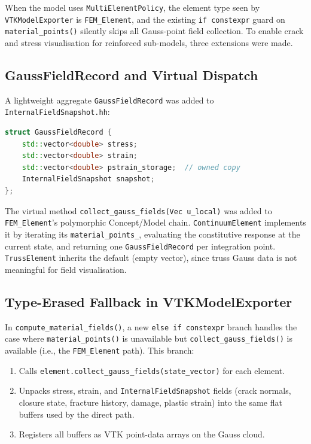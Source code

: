 When the model uses \texttt{MultiElementPolicy}, the element type seen
by \texttt{VTKModelExporter} is \texttt{FEM\_Element}, and the existing
\texttt{if constexpr} guard on \texttt{material\_points()} silently
skips all Gauss-point field collection.  To enable crack and stress
visualisation for reinforced sub-models, three extensions were made.

\subsection{GaussFieldRecord and Virtual Dispatch}

A lightweight aggregate \texttt{GaussFieldRecord} was added to
\texttt{InternalFieldSnapshot.hh}:

\begin{lstlisting}[language=C++, basicstyle=\ttfamily\small]
struct GaussFieldRecord {
    std::vector<double> stress;
    std::vector<double> strain;
    std::vector<double> pstrain_storage;  // owned copy
    InternalFieldSnapshot snapshot;
};
\end{lstlisting}

The virtual method \texttt{collect\_gauss\_fields(Vec\,u\_local)} was added
to \texttt{FEM\_Element}'s polymorphic Concept/Model chain.
\texttt{ContinuumElement} implements it by iterating its
\texttt{material\_points\_}, evaluating the constitutive response at the
current state, and returning one \texttt{GaussFieldRecord} per integration
point.  \texttt{TrussElement} inherits the default (empty vector), since
truss Gauss data is not meaningful for field visualisation.

\subsection{Type-Erased Fallback in VTKModelExporter}

In \texttt{compute\_material\_fields()}, a new \texttt{else if constexpr}
branch handles the case where \texttt{material\_points()} is unavailable
but \texttt{collect\_gauss\_fields()} is available (i.e., the
\texttt{FEM\_Element} path).  This branch:

\begin{enumerate}
  \item Calls \texttt{element.collect\_gauss\_fields(state\_vector)} for
        each element.
  \item Unpacks stress, strain, and \texttt{InternalFieldSnapshot} fields
        (crack normals, closure state, fracture history, damage, plastic
        strain) into the same flat buffers used by the direct path.
  \item Registers all buffers as VTK point-data arrays on the Gauss cloud.
\end{enumerate}

